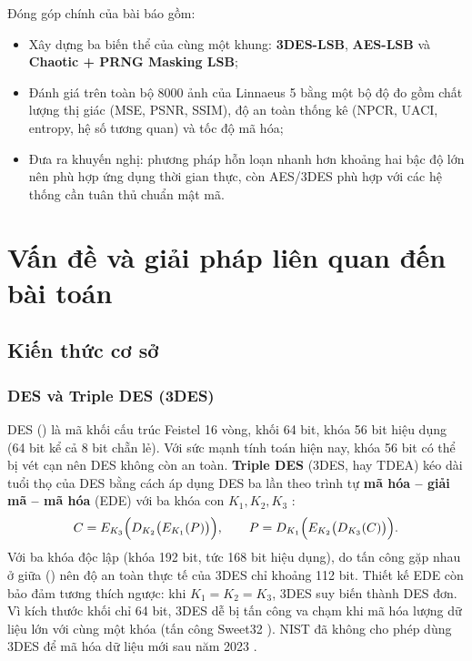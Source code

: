 Đóng góp chính của bài báo gồm:
\begin{itemize}
  \item Xây dựng ba biến thể của cùng một khung: \textbf{3DES-LSB}, \textbf{AES-LSB} và
        \textbf{Chaotic + PRNG Masking LSB};
  \item Đánh giá trên toàn bộ 8000 ảnh của Linnaeus 5 bằng một bộ độ đo gồm chất lượng thị giác
        (MSE, PSNR, SSIM), độ an toàn thống kê (NPCR, UACI, entropy, hệ số tương quan) và tốc độ
        mã hóa;
  \item Đưa ra khuyến nghị: phương pháp hỗn loạn nhanh hơn khoảng hai bậc độ lớn nên phù hợp
        ứng dụng thời gian thực, còn AES/3DES phù hợp với các hệ thống cần tuân thủ chuẩn mật mã.
\end{itemize}

\section{Vấn đề và giải pháp liên quan đến bài toán}

\subsection{Kiến thức cơ sở}

\subsubsection{DES và Triple DES (3DES)}

DES () là mã khối cấu trúc Feistel 16 vòng, khối 64 bit, khóa
56 bit hiệu dụng (64 bit kể cả 8 bit chẵn lẻ). Với sức mạnh tính toán hiện nay, khóa 56 bit
có thể bị vét cạn nên DES không còn an toàn. \textbf{Triple DES} (3DES, hay TDEA) kéo dài tuổi
thọ của DES bằng cách áp dụng DES ba lần theo trình tự \textbf{mã hóa -- giải mã -- mã hóa}
(EDE) với ba khóa con $K_1, K_2, K_3$ \cite{sp80067}:
\begin{equation}
  C = E_{K_3}\Bigl(D_{K_2}\bigl(E_{K_1}(P)\bigr)\Bigr), \qquad
  P = D_{K_1}\Bigl(E_{K_2}\bigl(D_{K_3}(C)\bigr)\Bigr).
  \label{eq:3des}
\end{equation}
Với ba khóa độc lập (khóa 192 bit, tức 168 bit hiệu dụng), do tấn công gặp nhau ở giữa
() nên độ an toàn thực tế của 3DES chỉ khoảng 112 bit. Thiết kế EDE còn
bảo đảm tương thích ngược: khi $K_1 = K_2 = K_3$, 3DES suy biến thành DES đơn. Vì kích thước khối
chỉ 64 bit, 3DES dễ bị tấn công va chạm khi mã hóa lượng dữ liệu lớn với cùng một khóa
(tấn công Sweet32 \cite{bhargavan2016}). NIST đã không cho phép dùng 3DES để mã hóa dữ liệu mới
sau năm 2023 \cite{sp800131a}.

